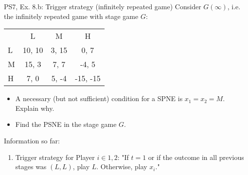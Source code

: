 \begin{frame}{PS7, Ex. 8.b: Trigger strategy (infinitely repeated game)}
    Consider $G(\infty)$, i.e. the infinitely repeated game with stage game $G$: \vspace{-6pt}
    \begin{table}
      \begin{tabular}{l|c|c|c|}
        \multicolumn{1}{c}{} & \multicolumn{1}{c}{L} & \multicolumn{1}{c}{M} & \multicolumn{1}{c}{H} \\\cline{2-4}
        L & 10, 10 & 3, 15 & 0, 7 \\\cline{2-4}
        M & 15, 3 & 7, 7 & -4, 5 \\\cline{2-4}
        H & 7, 0 & 5, -4 & -15, -15 \\\cline{2-4}
      \end{tabular}
    \end{table}
    \begin{itemize}
      \item[(b)] A necessary (but not sufficient) condition for a SPNE is $x_1 = x_2 = M$. Explain why.
    \end{itemize}
  \begin{multicols}{2}
    \begin{itemize}
      \item[(Step a)] Find the PSNE in the stage game $G$.
    \end{itemize}
    \vfill\null\columnbreak
    Information so far:
    \begin{enumerate}
      \item Trigger strategy for Player $i\in1,2$: "If $t=1$ or if the outcome in all previous stages was $(L,L)$, play $L$. Otherwise, play $x_i$."
    \end{enumerate}
    \vfill\null
  \end{multicols}
\end{frame}
